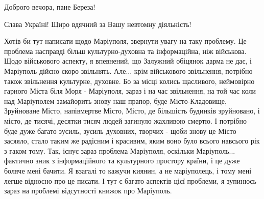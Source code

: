  
 
 
 
 

Доброго вечора, пане Береза!

Слава Україні! Щиро вдячний за Вашу невтомну діяльність!

Хотів би тут написати щодо Маріуполя, звернути увагу на таку проблему.  Це
проблема насправді більш культурно-духовна та інформаційна, ніж військова.
Щодо військового аспекту, я впевнений, що Залужний обіцянок дарма не дає, і
Маріуполь дійсно скоро звільнять. Але... крім військового звільнення, потрібно
також звільнення культурне, духовне. Бо за місці колись щасливого, неймовірно
гарного Міста біля Моря - Маріуполя, зараз і на час звільнення, на той час коли
над Маріуполем замайорить знову наш прапор, буде Місто-Кладовище, Зруйноване
Місто, напівмертве Місто, Місто, де більшість будинків зруйновано, і місто, де
тисячі, десятки тисяч людей загинуло жахливою смертю. І потрібно буде дуже
багато зусиль, зусиль духовних, творчих - щоби знову це Місто засяяло, стало
таким же радісним і красивим, яким воно було всього навсього рік з гаком тому.
Так, існує зараз проблема Маріуполя, оскільки Маріуполь... фактично зник з
інформаційного та культурного простору країни, і це дуже боляче мені бачити. Я
взагалі то кажучи киянин, а не маріуполець, і тому мені легше відносно про це
писати. І тут є багато аспектів цієї проблеми, я зупинюсь зараз на проблемі
відсутності книжок про Маріуполь.

